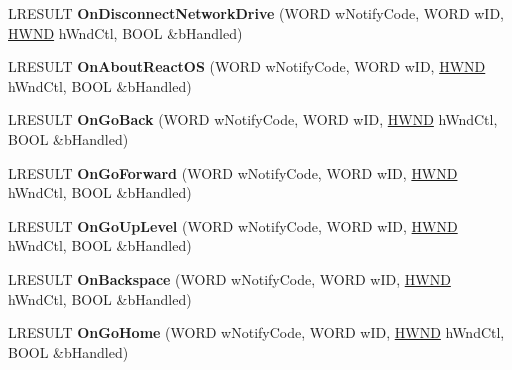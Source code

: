 \begin{DoxyCompactItemize}
\item 
\mbox{\label{class_c_shell_browser_a94b172373ae71972e4136c86b3d9e3a7}} 
L\+R\+E\+S\+U\+LT {\bfseries On\+Disconnect\+Network\+Drive} (W\+O\+RD w\+Notify\+Code, W\+O\+RD w\+ID, \hyperlink{interfacevoid}{H\+W\+ND} h\+Wnd\+Ctl, B\+O\+OL \&b\+Handled)
\item 
\mbox{\label{class_c_shell_browser_aa772e709dbf80b4680ac6cf0247ad015}} 
L\+R\+E\+S\+U\+LT {\bfseries On\+About\+React\+OS} (W\+O\+RD w\+Notify\+Code, W\+O\+RD w\+ID, \hyperlink{interfacevoid}{H\+W\+ND} h\+Wnd\+Ctl, B\+O\+OL \&b\+Handled)
\item 
\mbox{\label{class_c_shell_browser_ad5d875cef2f61e96cd9654b372686480}} 
L\+R\+E\+S\+U\+LT {\bfseries On\+Go\+Back} (W\+O\+RD w\+Notify\+Code, W\+O\+RD w\+ID, \hyperlink{interfacevoid}{H\+W\+ND} h\+Wnd\+Ctl, B\+O\+OL \&b\+Handled)
\item 
\mbox{\label{class_c_shell_browser_a6ede27c02aa0d2066f2b1fd500a26b57}} 
L\+R\+E\+S\+U\+LT {\bfseries On\+Go\+Forward} (W\+O\+RD w\+Notify\+Code, W\+O\+RD w\+ID, \hyperlink{interfacevoid}{H\+W\+ND} h\+Wnd\+Ctl, B\+O\+OL \&b\+Handled)
\item 
\mbox{\label{class_c_shell_browser_a751ac41d0c8ef818d2a3bc8e976d8072}} 
L\+R\+E\+S\+U\+LT {\bfseries On\+Go\+Up\+Level} (W\+O\+RD w\+Notify\+Code, W\+O\+RD w\+ID, \hyperlink{interfacevoid}{H\+W\+ND} h\+Wnd\+Ctl, B\+O\+OL \&b\+Handled)
\item 
\mbox{\label{class_c_shell_browser_a1df1457da67bee407095d7e6ec361597}} 
L\+R\+E\+S\+U\+LT {\bfseries On\+Backspace} (W\+O\+RD w\+Notify\+Code, W\+O\+RD w\+ID, \hyperlink{interfacevoid}{H\+W\+ND} h\+Wnd\+Ctl, B\+O\+OL \&b\+Handled)
\item 
\mbox{\label{class_c_shell_browser_a698433afd24abfd1653509ce5465e137}} 
L\+R\+E\+S\+U\+LT {\bfseries On\+Go\+Home} (W\+O\+RD w\+Notify\+Code, W\+O\+RD w\+ID, \hyperlink{interfacevoid}{H\+W\+ND} h\+Wnd\+Ctl, B\+O\+OL \&b\+Handled)
\item 
\mbox{\label{class_c_shell_browser_a5338a48e7685416565a7c307f862cac6}} 

\end{DoxyCompactItemize}
